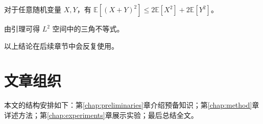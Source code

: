 \begin{lemma}
对于任意随机变量 \(X, Y\)，有 \(\mathbb{E}[(X+Y)^2] \leq 2\mathbb{E}[X^2] + 2\mathbb{E}[Y^2]\)。
\end{lemma}

\begin{corollary}
由引理可得 \(L^2\) 空间中的三角不等式。
\end{corollary}

\begin{remark}
以上结论在后续章节中会反复使用。
\end{remark}

\section{文章组织}

本文的结构安排如下：第\ref{chap:preliminaries}章介绍预备知识；第\ref{chap:method}章详述方法；第\ref{chap:experiments}章展示实验；最后总结全文。
